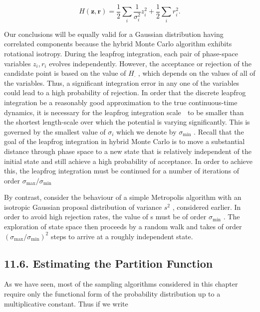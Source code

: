 \documentclass[
  10
]{article}
\begin{document}
\[
H (\mathbf {z}, \mathbf {r}) = \frac {1}{2} \sum_ {i} \frac {1}{\sigma_ {i} ^ {2}} z _ {i} ^ {2} + \frac {1}{2} \sum_ {i} r _ {i} ^ {2}.\tag{11.70}
\]

Our conclusions will be equally valid for a Gaussian distribution having
correlated components because the hybrid Monte Carlo algorithm exhibits
rotational isotropy. During the leapfrog integration, each pair of
phase-space variables \(z _ { i } , r _ { i }\) evolves independently.
However, the acceptance or rejection of the candidate point is based on
the value of \(H _ { \cdot }\) , which depends on the values of all of
the variables. Thus, a significant integration error in any one of the
variables could lead to a high probability of rejection. In order that
the discrete leapfrog integration be a reasonably good approximation to
the true continuous-time dynamics, it is necessary for the leapfrog
integration scale  to be smaller than the shortest length-scale over
which the potential is varying significantly. This is governed by the
smallest value of \(\sigma _ { i }\) which we denote by
\(\sigma _ { \mathrm { m i n } }\) . Recall that the goal of the
leapfrog integration in hybrid Monte Carlo is to move a substantial
distance through phase space to a new state that is relatively
independent of the initial state and still achieve a high probability of
acceptance. In order to achieve this, the leapfrog integration must be
continued for a number of iterations of order
\({ \sigma _ { \operatorname* { m a x } } } / { \sigma _ { \operatorname* { m i n } } }\)

By contrast, consider the behaviour of a simple Metropolis algorithm
with an isotropic Gaussian proposal distribution of variance
\(s ^ { 2 }\) , considered earlier. In order to avoid high rejection
rates, the value of s must be of order
\(\sigma _ { \mathrm { m i n } }\) . The exploration of state space then
proceeds by a random walk and takes of order
\(( \sigma _ { \operatorname* { m a x } } / \sigma _ { \operatorname* { m i n } } ) ^ { 2 }\)
steps to arrive at a roughly independent state.

\subsection{11.6. Estimating the Partition
Function}\label{estimating-the-partition-function}

As we have seen, most of the sampling algorithms considered in this
chapter require only the functional form of the probability distribution
up to a multiplicative constant. Thus if we write
\end{document}
